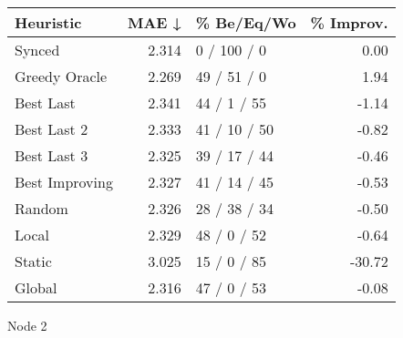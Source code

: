 \begin{tabular}{lrlr}
\toprule
\textbf{Heuristic} & \textbf{MAE ↓} & \textbf{\% Be/Eq/Wo} & \textbf{\% Improv.} \\
\midrule
            Synced &          2.314 &          0 / 100 / 0 &                0.00 \\
     Greedy Oracle &          2.269 &          49 / 51 / 0 &                1.94 \\
         Best Last &          2.341 &          44 / 1 / 55 &               -1.14 \\
       Best Last 2 &          2.333 &         41 / 10 / 50 &               -0.82 \\
       Best Last 3 &          2.325 &         39 / 17 / 44 &               -0.46 \\
    Best Improving &          2.327 &         41 / 14 / 45 &               -0.53 \\
            Random &          2.326 &         28 / 38 / 34 &               -0.50 \\
             Local &          2.329 &          48 / 0 / 52 &               -0.64 \\
            Static &          3.025 &          15 / 0 / 85 &              -30.72 \\
            Global &          2.316 &          47 / 0 / 53 &               -0.08 \\
\bottomrule
\end{tabular}
\caption{Node 2}
\label{tab:hr_iid_lr01_le2_bs2_2}
